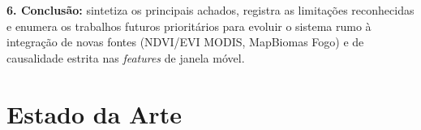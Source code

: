 \textbf{6. Conclusão:} sintetiza os principais achados, registra as limitações reconhecidas e enumera os trabalhos futuros prioritários para evoluir o sistema rumo à integração de novas fontes (NDVI/EVI MODIS, MapBiomas Fogo) e de causalidade estrita nas \emph{features} de janela móvel.

\chapter{Estado da Arte}
